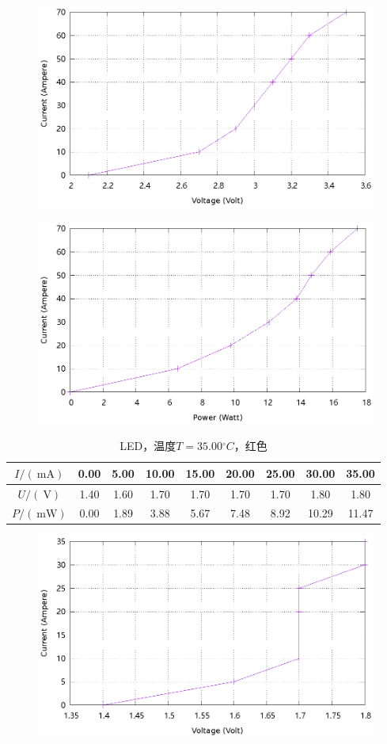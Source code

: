 \documentclass{ctexart}
\newcommand{\si}[1]{\  \mathrm{#1}}
\begin{document}
\begin{figure}[H]
    \centering
    \includegraphics[width=0.9\linewidth]{../output/led-vc-4.gnuplot}
\end{figure}
\begin{figure}[H]
    \centering
    \includegraphics[width=0.9\linewidth]{../output/led-pc-4.gnuplot}
\end{figure}
\newpage
\begin{table}[H]
    \centering
    \begin{tabular}{|c|c|c|c|c|c|c|c|c|}
        \hline
        $I/(\si{mA})$ & 0.00 & 5.00 & 10.00 & 15.00 & 20.00 & 25.00 & 30.00 & 35.00 \\\hline
        $U / (\si{V})$  & 1.40 & 1.60 & 1.70 & 1.70 & 1.70 & 1.70 & 1.80 & 1.80 \\\hline
        $P / (\si{mW})$ & 0.00 & 1.89 & 3.88 & 5.67 & 7.48 & 8.92 & 10.29 & 11.47 \\\hline
    \end{tabular}
    \caption{LED，温度$T=35.00{}^{\circ}C$，红色}
\end{table}
\begin{figure}[H]
    \centering
    \includegraphics[width=0.9\linewidth]{../output/led-vc-5.gnuplot}
\end{figure}
\end{document}
